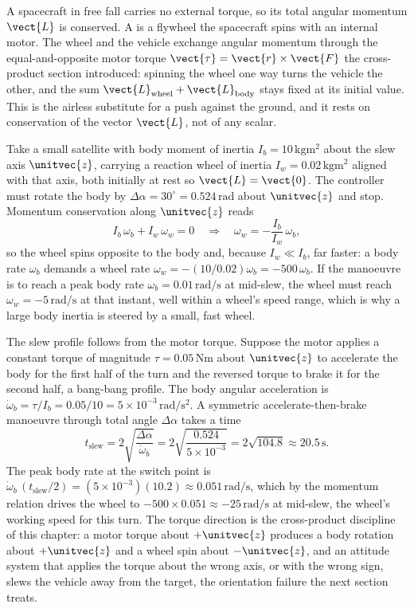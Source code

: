 A spacecraft in free fall carries no external torque, so its total
angular momentum $\vect{L}$ is conserved. A  is
a flywheel the spacecraft spins with an internal motor. The wheel and
the vehicle exchange angular momentum through the equal-and-opposite
motor torque $\vect{\tau} = \vect{r}\times\vect{F}$ the cross-product
section introduced: spinning the wheel one way turns the vehicle the
other, and the sum $\vect{L}_{\text{wheel}} + \vect{L}_{\text{body}}$
stays fixed at its initial value. This is the airless substitute for a
push against the ground, and it rests on conservation of the vector
$\vect{L}$, not of any scalar.

Take a small satellite with body moment of inertia $I_{b} = 10\,\si
{\kilogram\meter\squared}$ about the slew axis $\unitvec{z}$, carrying
a reaction wheel of inertia $I_{w} = 0.02\,\si{\kilogram\meter
\squared}$ aligned with that axis, both initially at rest so
$\vect{L} = \vect{0}$. The controller must rotate the body by
$\Delta\alpha = 30^{\circ} = 0.524\,\si{\radian}$ about $\unitvec{z}$
and stop. Momentum conservation along $\unitvec{z}$ reads
\[
I_{b}\,\omega_{b} + I_{w}\,\omega_{w} = 0
\quad\Longrightarrow\quad
\omega_{w} = -\frac{I_{b}}{I_{w}}\,\omega_{b},
\]
so the wheel spins opposite to the body and, because $I_{w}\ll I_{b}$,
far faster: a body rate $\omega_{b}$ demands a wheel rate
$\omega_{w} = -(10/0.02)\omega_{b} = -500\,\omega_{b}$. If the
manoeuvre is to reach a peak body rate $\omega_{b} = 0.01\,\si{\radian
\per\second}$ at mid-slew, the wheel must reach $\omega_{w} =
-5\,\si{\radian\per\second}$ at that instant, well within a wheel's
speed range, which is why a large body inertia is steered by a small,
fast wheel.

The slew profile follows from the motor torque. Suppose the motor
applies a constant torque of magnitude $\tau = 0.05\,\si{\newton\meter}$
about $\unitvec{z}$ to accelerate the body for the first half of the
turn and the reversed torque to brake it for the second half, a
bang-bang profile. The body angular acceleration is $\dot\omega_{b} =
\tau/I_{b} = 0.05/10 = 5\times 10^{-3}\,\si{\radian\per\second\squared}$.
A symmetric accelerate-then-brake manoeuvre through total angle
$\Delta\alpha$ takes a time
\[
t_{\text{slew}} = 2\sqrt{\frac{\Delta\alpha}{\dot\omega_{b}}} =
2\sqrt{\frac{0.524}{5\times 10^{-3}}} = 2\sqrt{104.8} \approx
20.5\,\si{\second}.
\]
The peak body rate at the switch point is $\dot\omega_{b}\,(t_{\text{
slew}}/2) = (5\times 10^{-3})(10.2) \approx 0.051\,\si{\radian\per
\second}$, which by the momentum relation drives the wheel to
$-500\times 0.051 \approx -25\,\si{\radian\per\second}$ at mid-slew,
the wheel's working speed for this turn. The torque direction is the
cross-product discipline of this chapter: a motor torque about
$+\unitvec{z}$ produces a body rotation about $+\unitvec{z}$ and a
wheel spin about $-\unitvec{z}$, and an attitude system that applies
the torque about the wrong axis, or with the wrong sign, slews the
vehicle away from the target, the orientation failure the next section
treats.

